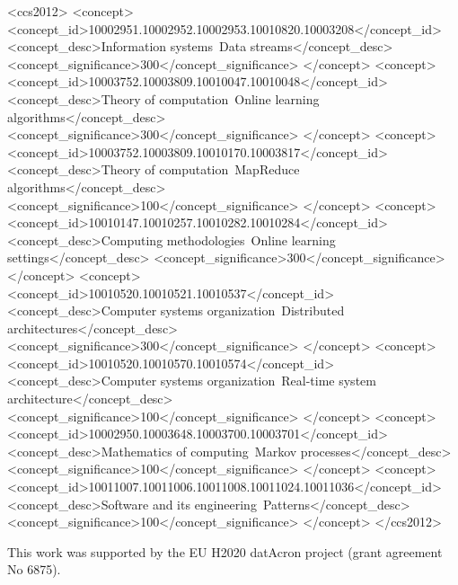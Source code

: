 \documentclass[sigconf,edbt]{acmart-edbt2018}
\begin{document}
%
\begin{CCSXML}
<ccs2012>
<concept>
<concept_id>10002951.10002952.10002953.10010820.10003208</concept_id>
<concept_desc>Information systems~Data streams</concept_desc>
<concept_significance>300</concept_significance>
</concept>
<concept>
<concept_id>10003752.10003809.10010047.10010048</concept_id>
<concept_desc>Theory of computation~Online learning algorithms</concept_desc>
<concept_significance>300</concept_significance>
</concept>
<concept>
<concept_id>10003752.10003809.10010170.10003817</concept_id>
<concept_desc>Theory of computation~MapReduce algorithms</concept_desc>
<concept_significance>100</concept_significance>
</concept>
<concept>
<concept_id>10010147.10010257.10010282.10010284</concept_id>
<concept_desc>Computing methodologies~Online learning settings</concept_desc>
<concept_significance>300</concept_significance>
</concept>
<concept>
<concept_id>10010520.10010521.10010537</concept_id>
<concept_desc>Computer systems organization~Distributed architectures</concept_desc>
<concept_significance>300</concept_significance>
</concept>
<concept>
<concept_id>10010520.10010570.10010574</concept_id>
<concept_desc>Computer systems organization~Real-time system architecture</concept_desc>
<concept_significance>100</concept_significance>
</concept>
<concept>
<concept_id>10002950.10003648.10003700.10003701</concept_id>
<concept_desc>Mathematics of computing~Markov processes</concept_desc>
<concept_significance>100</concept_significance>
</concept>
<concept>
<concept_id>10011007.10011006.10011008.10011024.10011036</concept_id>
<concept_desc>Software and its engineering~Patterns</concept_desc>
<concept_significance>100</concept_significance>
</concept>
</ccs2012>
\end{CCSXML}





\maketitle


\begin{acks}
	
	This work was supported by the EU H2020 datAcron project (grant agreement No 6875).
	
\end{acks}


 
\end{document}
